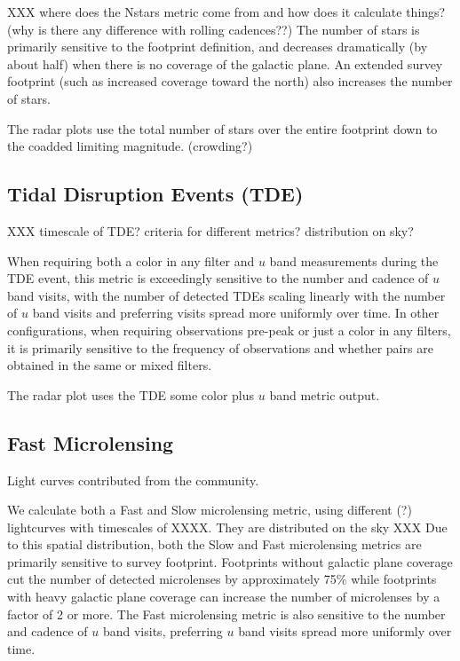 XXX  where does the Nstars metric come from and how does it calculate things? (why is there any difference with rolling cadences??)
The number of stars is primarily sensitive to the footprint definition, and decreases dramatically (by about half) when there is no coverage of the galactic plane. An extended survey footprint (such as increased coverage toward the north) also increases the number of stars.

The radar plots use the total number of stars over the entire footprint down to the coadded limiting magnitude. (crowding?)

\subsection{Tidal Disruption Events (TDE)}

XXX timescale of TDE? criteria for different metrics? distribution on sky?

When requiring both a color in any filter and $u$ band measurements during the TDE event, this metric is exceedingly sensitive to the number and cadence of $u$ band visits, with the number of detected TDEs scaling linearly with the number of $u$ band visits and preferring visits spread more uniformly over time. In other configurations, when requiring observations pre-peak or just a color in any filters, it is primarily sensitive to the frequency of observations and whether pairs are obtained in the same or mixed filters.

The radar plot uses the TDE some color plus $u$ band metric output.

\subsection{Fast Microlensing}

Light curves contributed from the community.

We calculate both a Fast and Slow microlensing metric, using different (?) lightcurves with timescales of XXXX. They are distributed on the sky XXX  Due to this spatial distribution, both the Slow and Fast microlensing metrics are primarily sensitive to survey footprint. Footprints without galactic plane coverage cut the number of detected microlenses by approximately 75\% while footprints with heavy galactic plane coverage can increase the number of microlenses by a factor of 2 or more. The Fast microlensing metric is also sensitive to the number and cadence of $u$ band visits, preferring $u$ band visits spread more uniformly over time. 

